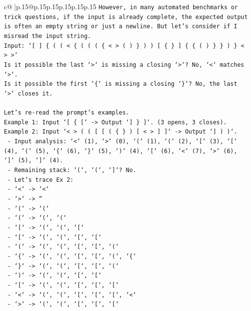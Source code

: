 \documentclass{article}
\begin{document}
{\begin{supertabular}{c@{$\;$}|p{.15\linewidth}@{}p{.15\linewidth}p{.15\linewidth}p{.15\linewidth}p{.15\linewidth}p{.15\linewidth}}
{{{\texttt{However, in many automated benchmarks or trick questions, if the input is already complete, the expected output is often an empty string or just a newline. But let's consider if I misread the input string.} \\
\texttt{Input: `{[} {]} \{ ( ( < \{ ( ( ( \{ < > ( ) \} ) ) {[} \{ \} {]} \{ \{ ( ) \} \} ) \} < > >`} \\
\texttt{Is it possible the last `>` is missing a closing `>`? No, `<` matches `>`.} \\
\texttt{Is it possible the first `\{` is missing a closing `\}`? No, the last `>` closes it.} \\
\\ 
\texttt{Let's re{-}read the prompt's examples.} \\
\texttt{Example 1: Input `{[} \{ {[}` {-}> Output `{]} \} {]}`. (3 opens, 3 closes).} \\
\texttt{Example 2: Input `< > ( ( {[} {[} ( \{ \} ) {[} < > {]} {]}` {-}> Output `{]} ) )`.} \\
\texttt{   {-} Input analysis: `<` (1), `>` (0), `(` (1), `(` (2), `{[}` (3), `{[}` (4), `(` (5), `\{` (6), `\}` (5), `)` (4), `{[}` (6), `<` (7), `>` (6), `{]}` (5), `{]}` (4).} \\
\texttt{   {-} Remaining stack: `(`, `(`, `{]}`? No.} \\
\texttt{   {-} Let's trace Ex 2:} \\
\texttt{     {-} `<` {-}> `<`} \\
\texttt{     {-} `>` {-}> ``} \\
\texttt{     {-} `(` {-}> `(`} \\
\texttt{     {-} `(` {-}> `(`, `(`} \\
\texttt{     {-} `{[}` {-}> `(`, `(`, `{[}`} \\
\texttt{     {-} `{[}` {-}> `(`, `(`, `{[}`, `{[}`} \\
\texttt{     {-} `(` {-}> `(`, `(`, `{[}`, `{[}`, `(`} \\
\texttt{     {-} `\{` {-}> `(`, `(`, `{[}`, `{[}`, `(`, `\{`} \\
\texttt{     {-} `\}` {-}> `(`, `(`, `{[}`, `{[}`, `(`} \\
\texttt{     {-} `)` {-}> `(`, `(`, `{[}`, `{[}`} \\
\texttt{     {-} `{[}` {-}> `(`, `(`, `{[}`, `{[}`, `{[}`} \\
\texttt{     {-} `<` {-}> `(`, `(`, `{[}`, `{[}`, `{[}`, `<`} \\
\texttt{     {-} `>` {-}> `(`, `(`, `{[}`, `{[}`, `{[}`} \\
}}}
\end{supertabular}}
\end{document}
